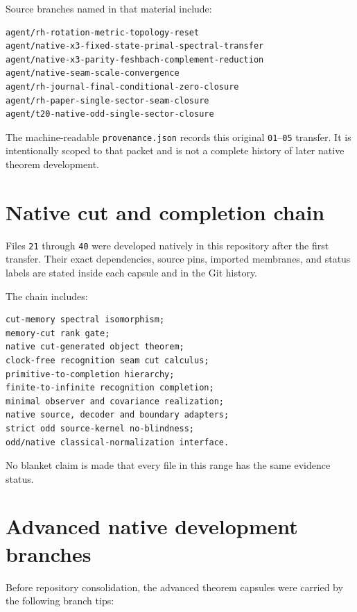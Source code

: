 Source branches named in that material include:

\begin{verbatim}
agent/rh-rotation-metric-topology-reset
agent/native-x3-fixed-state-primal-spectral-transfer
agent/native-x3-parity-feshbach-complement-reduction
agent/native-seam-scale-convergence
agent/rh-journal-final-conditional-zero-closure
agent/rh-paper-single-sector-seam-closure
agent/t20-native-odd-single-sector-closure
\end{verbatim}

The machine-readable \texttt{provenance.json} records this original \texttt{01}--\texttt{05} transfer. It is intentionally scoped to that packet and is not a complete history of later native theorem development.

\hypertarget{native-cut-and-completion-chain}{%
\section{Native cut and completion chain}\label{native-cut-and-completion-chain}}

Files \texttt{21} through \texttt{40} were developed natively in this repository after the first transfer. Their exact dependencies, source pins, imported membranes, and status labels are stated inside each capsule and in the Git history.

The chain includes:

\begin{verbatim}
cut-memory spectral isomorphism;
memory-cut rank gate;
native cut-generated object theorem;
clock-free recognition seam cut calculus;
primitive-to-completion hierarchy;
finite-to-infinite recognition completion;
minimal observer and covariance realization;
native source, decoder and boundary adapters;
strict odd source-kernel no-blindness;
odd/native classical-normalization interface.
\end{verbatim}

No blanket claim is made that every file in this range has the same evidence status.

\hypertarget{advanced-native-development-branches}{%
\section{Advanced native development branches}\label{advanced-native-development-branches}}

Before repository consolidation, the advanced theorem capsules were carried by the following branch tips:

